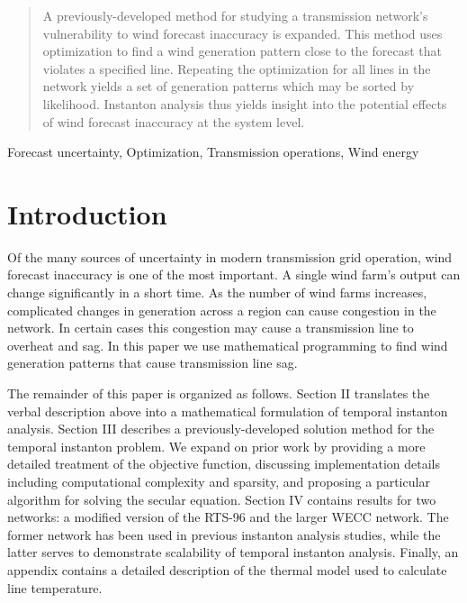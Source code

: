 \documentclass[conference]{IEEEtran}
\begin{document}
\begin{abstract}
A previously-developed method for studying a transmission network's vulnerability to wind forecast inaccuracy is expanded. This method uses optimization to find a wind generation pattern close to the forecast that violates a specified line. Repeating the optimization for all lines in the network yields a set of generation patterns which may be sorted by likelihood. Instanton analysis thus yields insight into the potential effects of wind forecast inaccuracy at the system level.
\end{abstract}

\begin{IEEEkeywords}
Forecast uncertainty, Optimization, Transmission operations, Wind energy
\end{IEEEkeywords}


\section{Introduction}\label{sec:intro}

Of the many sources of uncertainty in modern transmission grid operation, wind forecast inaccuracy is one of the most important. A single wind farm's output can change significantly in a short time. As the number of wind farms increases, complicated changes in generation across a region can cause congestion in the network. In certain cases this congestion may cause a transmission line to overheat and sag. In this paper we use mathematical programming to find wind generation patterns that cause transmission line sag.

The remainder of this paper is organized as follows. Section II translates the verbal description above into a mathematical formulation of temporal instanton analysis. Section III describes a previously-developed solution method for the temporal instanton problem. We expand on prior work by providing a more detailed treatment of the objective function, discussing implementation details including computational complexity and sparsity, and proposing a particular algorithm for solving the secular equation. Section IV contains results for two networks: a modified version of the RTS-96 and the larger WECC network. The former network has been used in previous instanton analysis studies, while the latter serves to demonstrate scalability of temporal instanton analysis. Finally, an appendix contains a detailed description of the thermal model used to calculate line temperature.
\end{document}
